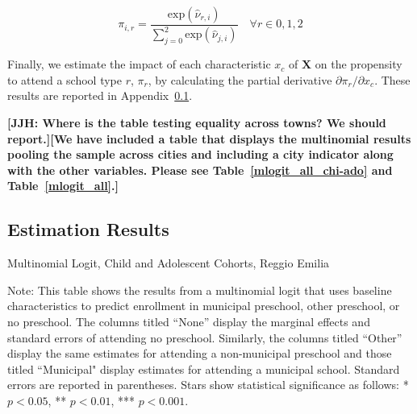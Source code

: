 \begin{equation}
\pi_{i,r} = \frac{\text{exp}(\hat{\nu}_{r,i})}{\sum\limits_{j=0}^{2} \text{exp}(\hat{\nu}_{j,i})} \quad \forall  r \in 0,1,2
\end{equation}

Finally, we estimate the impact of each characteristic $x_c$ of $\bm{X}$ on the propensity to attend a school type $r$, $\pi_{r}$, by calculating the partial derivative $\partial \pi_{r}/\partial x_c$. These results are reported in Appendix~\ref{appendix:mlogit}.

\textbf{[JJH: Where is the table testing equality across towns? We should report.][We have included a table that displays the multinomial results pooling the sample across cities and including a city indicator along with the other variables. Please see Table~\ref{mlogit_all_chi-ado} and Table~\ref{mlogit_all}.]}



\subsection{Estimation Results}\label{appendix:mlogit}



\begin{table}[H]
\centering
\caption{Multinomial Logit, Child and Adolescent Cohorts, Reggio Emilia} \label{mlogit-chi-ado-RE}
\begin{adjustbox}{width=\textwidth}
\begin{threeparttable}

\begin{tablenotes}
\footnotesize\raggedright{Note: This table shows the results from a multinomial logit that uses baseline characteristics to predict enrollment in municipal preschool, other preschool, or no preschool. The columns titled ``None'' display the marginal effects and standard errors of attending no preschool. Similarly, the columns titled ``Other'' display the same estimates for attending a non-municipal preschool and those titled ``Municipal" display estimates for attending a municipal school. Standard errors are reported in parentheses. Stars show statistical significance as follows: * $p < 0.05$, ** $p < 0.01$, *** $p < 0.001$.}
\end{tablenotes}
\end{threeparttable}
\end{adjustbox}
\end{table}

